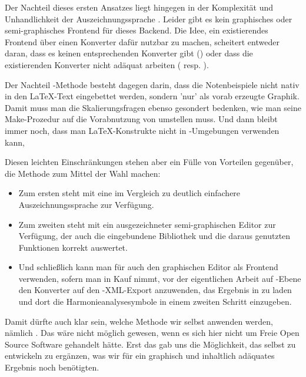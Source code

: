 Der Nachteil dieses ersten Ansatzes liegt hingegen in der Komplexität und
Unhandlichkeit der Auszeichnungssprache . Leider gibt es kein
graphisches oder semi-graphisches Frontend für dieses Backend. Die Idee, ein
existierendes Frontend über einen Konverter dafür nutzbar zu machen, scheitert
entweder daran, dass es keinen entsprechenden Konverter gibt ()
oder dass die existierenden Konverter nicht adäquat arbeiten ( resp.
).

Der Nachteil -Methode besteht dagegen darin, dass die
Notenbeispiele nicht nativ in den \LaTeX-Text eingebettet werden, sondern 'nur'
als vorab erzeugte Graphik. Damit muss man die Skalierungsfragen ebenso
gesondert bedenken, wie man seine Make-Prozedur auf die Vorabnutzung von
 umstellen muss. Und dann bleibt immer noch, dass man
\LaTeX-Konstrukte nicht in -Umgebungen verwenden kann,

Diesen leichten Einschränkungen stehen aber ein Fülle von Vorteilen gegenüber,
die Methode  zum Mittel der Wahl machen:

\begin{itemize}
  \item Zum ersten steht mit  eine im Vergleich zu 
  deutlich einfachere Auszeichnungssprache zur Verfügung.
  \item Zum zweiten steht mit  ein ausgezeichneter
  semi-graphischen Editor zur Verfügung, der auch die eingebundene Bibliothek
   und die daraus genutzten Funktionen korrekt auswertet.
  \item Und schließlich kann man für  auch den graphischen Editor
   als Frontend verwenden, sofern man in Kauf nimmt, vor der
  eigentlichen Arbeit auf -Ebene den Konverter
   auf den -XML-Export anzuwenden, das Ergebnis
  in  zu laden und dort die Harmonieanalysesymbole in einem
  zweiten Schritt einzugeben.
\end{itemize}

Damit dürfte auch klar sein, welche Methode wir selbst anwenden werden, nämlich
. Das wäre nicht möglich gewesen, wenn
es sich hier nicht um Freie Open Source Software gehandelt hätte. Erst das gab
uns die Möglichkeit, das selbst zu entwickeln zu ergänzen, was wir für ein
graphisch und inhaltlich adäquates Ergebnis noch benötigten.

